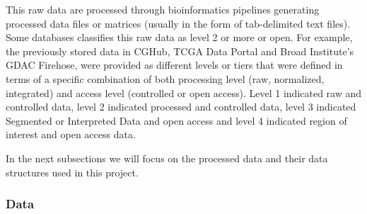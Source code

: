 This raw data are processed through bioinformatics pipelines generating
processed data files or matrices (usually in the form of tab-delimited text files).
Some databases classifies this raw data as level 2 or more or open.
For example, the previously stored data in CGHub, TCGA Data Portal and Broad Institute’s GDAC Firehose, were provided as different levels or tiers that were defined in terms of a specific combination of both processing level (raw, normalized, integrated) and access level (controlled or open access). Level 1 indicated raw and controlled data, level 2 indicated processed and controlled data, level 3 indicated Segmented or Interpreted Data and open access and level 4 indicated region of interest and open access data.

In the next subsections we will focus on the processed data and their data
structures used in this project.

\subsubsection{Data}

